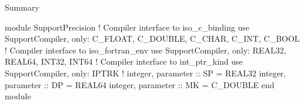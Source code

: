 \documentclass{report}
\begin{document}
Summary\\
\begin{codefull}
module SupportPrecision
  ! Compiler interface to iso_c_binding
  use SupportCompiler, only: C_FLOAT, C_DOUBLE, C_CHAR, C_INT, C_BOOL
  ! Compiler interface to iso_fortran_env
  use SupportCompiler, only: REAL32, REAL64, INT32, INT64
  ! Compiler interface to int_ptr_kind
  use SupportCompiler, only: IPTRK
  !
  integer, parameter :: SP = REAL32
  integer, parameter :: DP = REAL64
  integer, parameter :: MK = C_DOUBLE
end module
\end{codefull}
\end{document}
